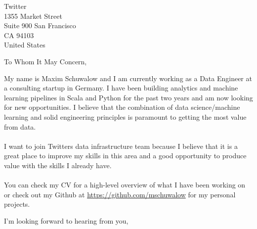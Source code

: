 \documentclass[sender,
               paper=a4,
               sigleft=false,
               version=last,
               fontsize=11pt,
               DIV=13,
               BCOR=0mm]{scrlttr2}
\begin{document}

\begin{letter}{
  Twitter\\
  1355 Market Street\\
  Suite 900 San Francisco\\
  CA 94103\\
  United States
}
\opening{To Whom It May Concern,}
My name is Maxim Schuwalow and I am currently working as a Data Engineer at a consulting startup in Germany. I have been building analytics and machine learning pipelines in Scala and Python for the past two years and am now looking for new opportunities. I believe that the combination of data science/machine learning and solid engineering principles is paramount to getting the most value from data.\\\\
I want to join Twitters data infrastructure team because I believe that it is a great place to improve my skills in this area and a good opportunity to produce value with the skills I already have.\\\\
You can check my CV for a high-level overview of what I have been working on or check out my Github at \href{https://github.com/mschuwalow}{https://github.com/mschuwalow} for my personal projects.

\closing{I'm looking forward to hearing from you,}
\end{letter}
\end{document}
